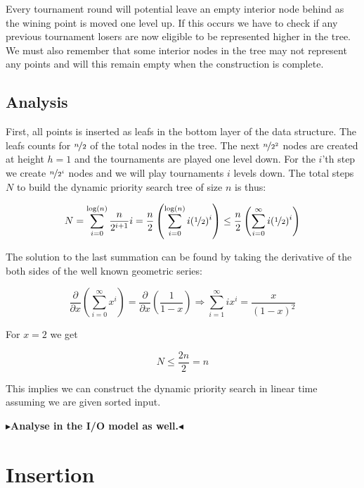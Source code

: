 \documentclass[twoside,11pt,openright]{report}
\newcommand{\todo}[1]{{\color[rgb]{.5,0,0}\textbf{$\blacktriangleright$#1$\blacktriangleleft$}}}
\begin{document}
Every tournament round will potential leave an empty interior node behind as the wining point is moved one level up. If this occurs we have to check if any previous tournament losers are now eligible to be represented higher in the tree. We must also remember that some interior nodes in the tree may not represent any points and will this remain empty when the construction is complete.

\subsection*{Analysis}
First, all points is inserted as leafs in the bottom layer of the data structure. The leafs counts for $\nicefrac{n}{2}$ of the total nodes in the tree. The next $\nicefrac{n}{2^2}$ nodes are created at height $h = 1$ and the tournaments are played one level down. For the $i$'th step we create $\nicefrac{n}{2^i}$ nodes and we will play tournaments $i$ levels down. The total steps $N$ to build the dynamic priority search tree of size $n$ is thus:

$$ N = \sum\limits_{i=0}^{\log(n)} \frac{n}{2^{i+1}}i = \frac{n}{2} \left( \sum\limits_{i=0}^{\log(n)} i(\nicefrac{1}{2})^i \right) \leq \frac{n}{2} \left( \sum\limits_{i=0}^{\infty} i(\nicefrac{1}{2})^i \right)$$

The solution to the last summation can be found by taking the derivative of the both sides of the well known geometric series:

$$ \frac{\partial}{\partial x} \left( \sum\limits_{i=0}^{\infty} x^i \right) = \frac{\partial}{\partial x} \left( \frac{1}{1-x} \right) \Rightarrow \sum_{i=1}^{\infty} ix^i = \frac{x}{(1-x)^2} $$

For $x = 2$ we get

$$N \leq \frac{2n}{2} = n $$

This implies we can construct the dynamic priority search in linear time assuming we are given sorted input.

\todo{Analyse in the I/O model as well.}

\section{Insertion}
\end{document}
